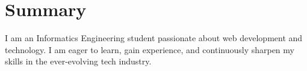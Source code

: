 \section*{Summary}

I am an Informatics Engineering student passionate about web development and technology. I am eager to learn, gain experience, and continuously sharpen my skills in the ever-evolving tech industry.
